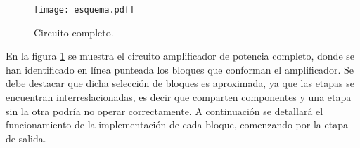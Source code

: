 \begin{figure}
	\centering
	\texttt{[image: esquema.pdf]}
	\caption{Circuito completo.}
	\label{fig.cto_completo}
	\end{figure}

En la figura \ref{fig.cto_completo} se muestra el circuito amplificador de potencia completo, donde se han identificado en línea punteada los bloques que conforman el amplificador. Se debe destacar que dicha selección de bloques es aproximada, ya que las etapas se encuentran interreslacionadas, es decir que comparten componentes y una etapa sin la otra podría no operar correctamente. A continuación se detallará el funcionamiento de la implementación de cada bloque, comenzando por la etapa de salida.
